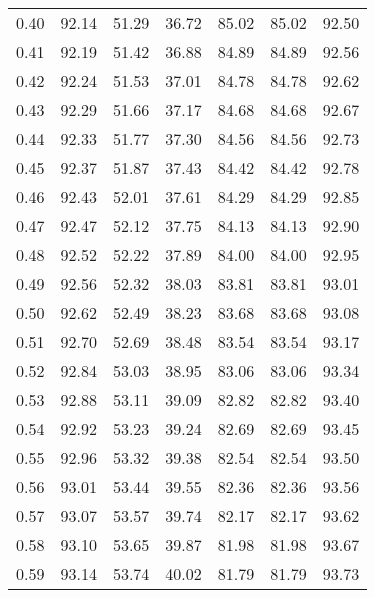 \begin{tabular}{|c|c|c|c|c|c|c|}
      0.40 &     92.14 &     51.29 &      36.72 &   85.02 &      85.02 &         92.50 \\
      0.41 &     92.19 &     51.42 &      36.88 &   84.89 &      84.89 &         92.56 \\
      0.42 &     92.24 &     51.53 &      37.01 &   84.78 &      84.78 &         92.62 \\
      0.43 &     92.29 &     51.66 &      37.17 &   84.68 &      84.68 &         92.67 \\
      0.44 &     92.33 &     51.77 &      37.30 &   84.56 &      84.56 &         92.73 \\
      0.45 &     92.37 &     51.87 &      37.43 &   84.42 &      84.42 &         92.78 \\
      0.46 &     92.43 &     52.01 &      37.61 &   84.29 &      84.29 &         92.85 \\
      0.47 &     92.47 &     52.12 &      37.75 &   84.13 &      84.13 &         92.90 \\
      0.48 &     92.52 &     52.22 &      37.89 &   84.00 &      84.00 &         92.95 \\
      0.49 &     92.56 &     52.32 &      38.03 &   83.81 &      83.81 &         93.01 \\
      0.50 &     92.62 &     52.49 &      38.23 &   83.68 &      83.68 &         93.08 \\
      0.51 &     92.70 &     52.69 &      38.48 &   83.54 &      83.54 &         93.17 \\
      0.52 &     92.84 &     53.03 &      38.95 &   83.06 &      83.06 &         93.34 \\
      0.53 &     92.88 &     53.11 &      39.09 &   82.82 &      82.82 &         93.40 \\
      0.54 &     92.92 &     53.23 &      39.24 &   82.69 &      82.69 &         93.45 \\
      0.55 &     92.96 &     53.32 &      39.38 &   82.54 &      82.54 &         93.50 \\
      0.56 &     93.01 &     53.44 &      39.55 &   82.36 &      82.36 &         93.56 \\
      0.57 &     93.07 &     53.57 &      39.74 &   82.17 &      82.17 &         93.62 \\
      0.58 &     93.10 &     53.65 &      39.87 &   81.98 &      81.98 &         93.67 \\
      0.59 &     93.14 &     53.74 &      40.02 &   81.79 &      81.79 &         93.73 \\

\end{tabular}
